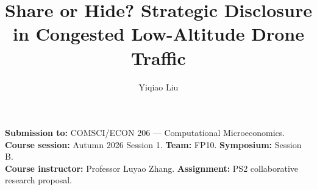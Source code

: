 \documentclass[sigconf,nonacm]{acmart}
\title{Share or Hide? Strategic Disclosure in Congested Low-Altitude Drone Traffic}
\author{Yiqiao Liu}
\affiliation{\institution{Duke Kunshan University}\city{Kunshan}\country{China}}
\newcommand{\CourseNumber}{COMSCI/ECON 206}
\newcommand{\CourseName}{Computational Microeconomics}
\newcommand{\CourseSession}{Autumn 2026 Session 1}
\newcommand{\Instructor}{Professor Luyao Zhang}
\newcommand{\TeamCode}{FP10}
\newcommand{\SymposiumSession}{Session B}
\newcommand{\coursemeta}{\noindent\textbf{Submission to:} \CourseNumber{} --- \CourseName.\\
\textbf{Course session:} \CourseSession. \textbf{Team:} \TeamCode. \textbf{Symposium:} \SymposiumSession.\\
\textbf{Course instructor:} \Instructor. \textbf{Assignment:} PS2 collaborative research proposal.\par\smallskip}
\begin{document}
\begin{teaserfigure}
  \captionsetup{skip=5pt}
  \centering
  
  \caption{Integrated evidence chain. The three questions meet in one auditable sequence: a Bayesian disclosure model, exhaustive equilibrium and welfare tests, the CCAR mechanism test, an exploratory decision environment, a bounded downstream allocation comparison, and a practical revision gate.}
  \label{fig:teaser}
\end{teaserfigure}
\maketitle\raggedbottom\coursemeta


\end{document}

